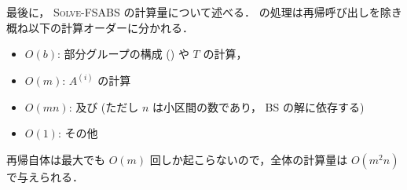 最後に， \textsc{Solve-FSABS} の計算量について述べる．  の処理は再帰呼び出しを除き概ね以下の計算オーダーに分かれる．
\begin{itemize}
\item $O(b)$: 部分グループの構成 (\label{subgroup}) や $T$ の計算， 
\item $O(m)$: $A^{(i)}$ の計算
\item $O(mn)$:  及び  (ただし $n$ は小区間の数であり， BS の解に依存する)
\item $O(1)$: その他
\end{itemize}
再帰自体は最大でも $O(m)$ 回しか起こらないので，全体の計算量は $O(m^2n)$ で与えられる．